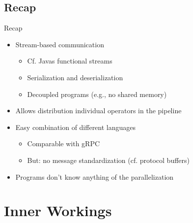 \subsection{Recap} %
\begin{frame}{Recap}
   \begin{itemize}[<+(1)->]
      \itemsep12pt
      \item Stream-based communication \begin{itemize}
         \item Cf. Javas functional streams
         \item Serialization and deserialization %
         \item Decoupled programs (e.g., no shared memory)
      \end{itemize}
      \item Allows distribution individual operators in the pipeline
      \item Easy combination of different languages \begin{itemize}
         \item Comparable with gRPC
         \item But: no message standardization (cf. protocol buffers)
      \end{itemize}
      \item Programs don't know anything of the parallelization
   \end{itemize}
\end{frame}
\SidebarReset

\section{Inner Workings}

